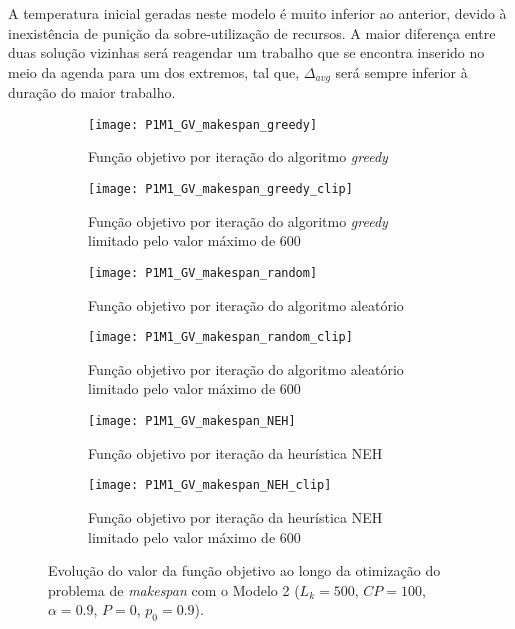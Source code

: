 A temperatura inicial geradas neste modelo é muito inferior ao anterior, devido à inexistência de punição da sobre-utilização de recursos. A maior diferença entre duas solução vizinhas será reagendar um trabalho que se encontra inserido no meio da agenda para um dos extremos, tal que, $\Delta_{avg}$ será sempre inferior à duração do maior trabalho.\\
\begin{figure}[H]
    \centering
    \begin{subfigure}{0.49\textwidth}
        \centering
        \texttt{[image: P1M1\_GV\_makespan\_greedy]}
        \caption{Função objetivo por iteração do algoritmo \textit{greedy}}
        \label{fig:P1M1_GV_makespan_greedy}
    \end{subfigure}
    \hfill
    \begin{subfigure}{0.49\textwidth}
        \centering
        \texttt{[image: P1M1\_GV\_makespan\_greedy\_clip]}
        \caption{Função objetivo por iteração do algoritmo \textit{greedy} limitado pelo valor máximo de 600}
        \label{fig:P1M1_GV_makespan_greedy_clip}
    \end{subfigure}
    
    \begin{subfigure}{0.49\textwidth}
        \centering
        \texttt{[image: P1M1\_GV\_makespan\_random]}
        \caption{Função objetivo por iteração do algoritmo aleatório}
        \label{fig:P1M1_GV_makespan_random}
    \end{subfigure}
    \hfill
    \begin{subfigure}{0.49\textwidth}
        \centering
        \texttt{[image: P1M1\_GV\_makespan\_random\_clip]}
        \caption{Função objetivo por iteração do algoritmo aleatório limitado pelo valor máximo de 600}
        \label{fig:P1M1_GV_makespan_random_clip}
    \end{subfigure}
    
    \begin{subfigure}{0.49\textwidth}
        \centering
        \texttt{[image: P1M1\_GV\_makespan\_NEH]}
        \caption{Função objetivo por iteração da heurística NEH}
        \label{fig:P1M1_GV_makespan_NEH}
    \end{subfigure}
    \hfill
    \begin{subfigure}{0.49\textwidth}
        \centering
        \texttt{[image: P1M1\_GV\_makespan\_NEH\_clip]}
        \caption{Função objetivo por iteração da heurística NEH limitado pelo valor máximo de 600}
        \label{fig:P1M1_GV_makespan_NEH_clip}
    \end{subfigure}
    \caption{Evolução do valor da função objetivo ao longo da otimização do problema de \textit{makespan} com o Modelo 2 ($L_{k}=500$, $CP=100$, $\alpha=0.9$, $P=0$, $p_{0}=0.9$).}
    \label{fig:P1M1_GV_dif_sol_ini}
\end{figure}

